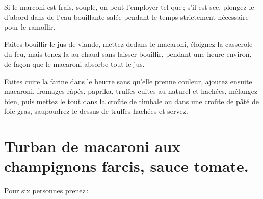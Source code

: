 Si le marconi est frais, souple, on peut l'employer tel que ; s'il est sec,
plongez-le d'abord dans de l'eau bouillante salée pendant le temps strictement
nécessaire pour le ramollir.

Faites bouillir le jus de viande, mettez dedans le macaroni, éloignez la
casserole du feu, mais tenez-la au chaud sans laisser bouillir, pendant une
heure environ, de façon que le macaroni absorbe tout le jus.

Faites cuire la farine dans le beurre sans qu'elle prenne couleur, ajoutez
ensuite macaroni, fromages râpés, paprika, truffes cuites au naturel et
hachées, mélangez bien, puis mettez le tout dans la croûte de timbale ou dans
une croûte de pâté de foie gras, saupoudrez le dessus de truffes hachées et
servez.

\section*{\centering Turban de macaroni aux champignons farcis, sauce tomate.}
{}

Pour six personnes prenez :

